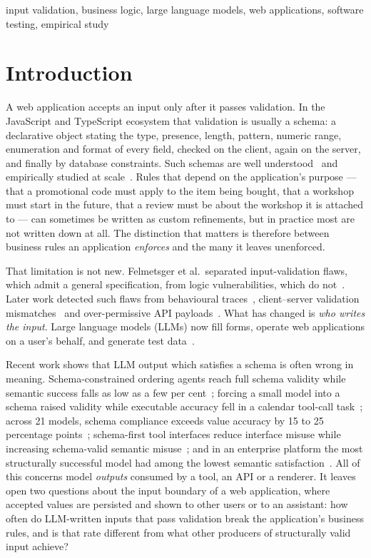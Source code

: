 \documentclass[conference]{IEEEtran}
\begin{document}
\begin{IEEEkeywords}
input validation, business logic, large language models, web applications, software testing,
empirical study
\end{IEEEkeywords}

\section{Introduction}

A web application accepts an input only after it passes validation. In the JavaScript and TypeScript
ecosystem that validation is usually a schema: a declarative object stating the type, presence,
length, pattern, numeric range, enumeration and format of every field, checked on the client, again
on the server, and finally by database constraints. Such schemas are well
understood~\cite{pezoa2016foundations,attouche2023jsonschema} and empirically studied at
scale~\cite{baazizi2021usagenot}. Rules that depend on the application's purpose --- that a promotional
code must apply to the item being bought, that a workshop must start in the future, that a review must
be about the workshop it is attached to --- can sometimes be written as custom refinements, but in
practice most are not written down at all. The distinction that matters is therefore between business
rules an application \emph{enforces} and the many it leaves unenforced.

That limitation is not new. Felmetsger et al.\ separated input-validation flaws, which admit a general
specification, from logic vulnerabilities, which do not~\cite{felmetsger2010waler}. Later work detected
such flaws from behavioural traces~\cite{pellegrino2014logicflaws}, client--server validation
mismatches~\cite{bisht2010notamper} and over-permissive API payloads~\cite{corradini2023massassignment}.
What has changed is \emph{who writes the input}. Large language models (LLMs) now fill forms, operate web
applications on a user's behalf, and generate test data~\cite{li2026webformtest,alian2024formnexus,li2025formfactory}.

Recent work shows that LLM output which satisfies a schema is often wrong in meaning. Schema-constrained
ordering agents reach full schema validity while semantic success falls as low as a few per
cent~\cite{li2026orderbench}; forcing a small model into a schema raised validity while executable
accuracy fell in a calendar tool-call task~\cite{ray2026constrainttax}; across 21 models, schema
compliance exceeds value accuracy by 15 to 25 percentage points~\cite{singh2026sob}; schema-first tool
interfaces reduce interface misuse while increasing schema-valid semantic misuse~\cite{sigdel2026schemafirst};
and in an enterprise platform the most structurally successful model had among the lowest semantic
satisfaction~\cite{wrenn2026enterprise}. All of this concerns model \emph{outputs} consumed by a tool,
an API or a renderer. It leaves open two questions about the input boundary of a web application,
where accepted values are persisted and shown to other users or to an assistant: how often do
LLM-written inputs that pass validation break the application's business rules, and is that rate
different from what other producers of structurally valid input achieve?
\end{document}
